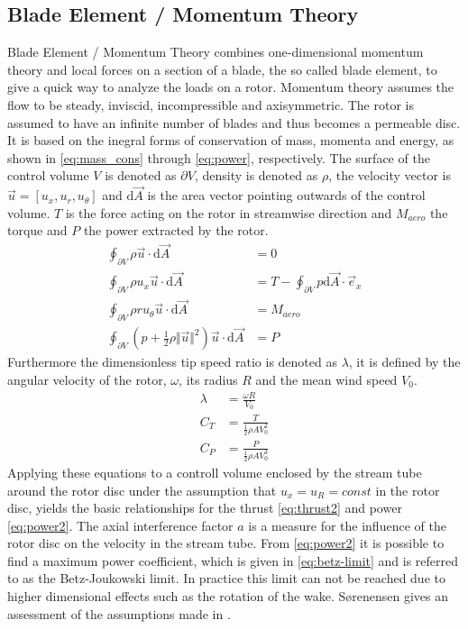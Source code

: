 \subsection{Blade Element / Momentum Theory}
Blade Element / Momentum Theory combines one-dimensional momentum theory and local forces on a section of a blade, the so called blade element, to give a quick way to analyze the loads on a rotor. Momentum theory assumes the flow to be steady, inviscid, incompressible and axisymmetric. The rotor is assumed to have an infinite number of blades and thus becomes a permeable disc. It is based on the inegral forms of conservation of mass, momenta and energy, as shown in \eqref{eq:mass_cons} through \eqref{eq:power}, respectively. The surface of the control volume $V$ is denoted as $\partial V$, density is denoted as $\rho$, the velocity vector is $\vec{u}= \left[u_x, u_r, u_\theta \right]$  and $\mathrm{d}\vec{A}$ is the area vector pointing outwards of the control volume. $T$ is the force acting on the rotor in streamwise direction and $M_{aero}$ the torque and $P$ the power extracted by the rotor. 
\begin{align}
	\oint_{\partial V} \rho \vec{u} \cdot \mathrm{d}\vec{A} &= 0 \label{eq:mass_cons}\\
	\oint_{\partial V} \rho u_x \vec{u} \cdot \mathrm{d}\vec{A} &= T - \oint_{\partial V} p \mathrm{d} \vec{A} \cdot \vec{e}_x \label{eq:thrust} \\
	\oint_{\partial V} \rho r u_\theta \vec{u} \cdot \mathrm{d} \vec{A} &= M_{aero} \label{eq:torque}\\
	\oint_{\partial V} \left(p + \frac{1}{2} \rho \Vert\vec{u} \Vert^2\right) \vec{u} \cdot \mathrm{d} \vec{A} &= P \label{eq:power}
\end{align}	
Furthermore the dimensionless tip speed ratio is denoted as $\lambda$, it is defined by the angular velocity of the rotor, $\omega$, its radius $R$ and the mean wind speed $V_0$. \cite[p. 7 - 8]{sorensen_general_2016}
\begin{align}
	\lambda &= \frac{\omega R}{V_0} \\
	C_T &= \frac{T}{\frac{1}{2} \rho A V_0^2} \\
	C_P &= \frac{P}{\frac{1}{2} \rho A V_0^3} 
\end{align}
Applying these equations to a controll volume enclosed by the stream tube around the rotor disc under the assumption that $u_x = u_R = const$ in the rotor disc, yields the basic relationships for the thrust \eqref{eq:thrust2} and power \eqref{eq:power2}. The axial interference factor $a$ is a measure for the influence of the rotor disc on the velocity in the stream tube.  From \eqref{eq:power2} it is possible to find a maximum power coefficient, which is given in \eqref{eq:betz-limit} and is referred to as the Betz-Joukowski limit. In practice this limit can not be reached due to higher dimensional effects such as the rotation of the wake. \cite[p.10 - 11]{sorensen_general_2016} Sørenensen gives an assessment of the assumptions made in \cite{sorensen_general_2016}. 
